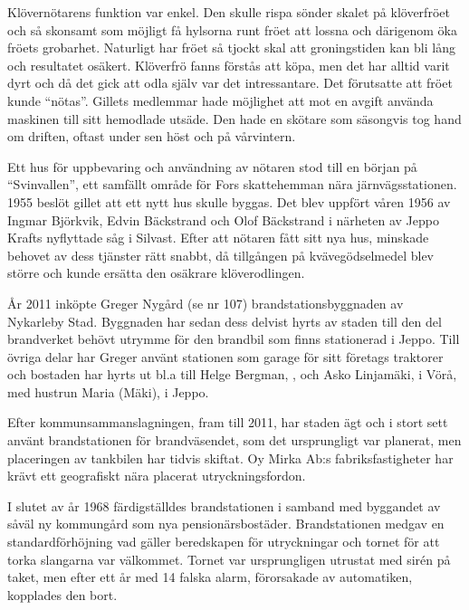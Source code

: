 Klövernötarens funktion var enkel. Den skulle rispa sönder skalet på klöverfröet och så skonsamt som möjligt få hylsorna runt fröet att lossna och därigenom öka fröets grobarhet. Naturligt har fröet så tjockt skal att groningstiden kan bli lång och resultatet osäkert. Klöverfrö fanns förstås att köpa, men det har alltid varit dyrt och då det gick att odla själv var det intressantare. Det förutsatte att fröet kunde ``nötas''. Gillets medlemmar hade möjlighet att mot en avgift använda maskinen till sitt hemodlade utsäde. Den hade en skötare som säsongvis tog hand om driften, oftast under sen höst och på vårvintern.

Ett hus för uppbevaring och användning av nötaren stod till en början på ``Svinvallen'', ett samfällt område för Fors skattehemman nära järnvägsstationen. 1955 beslöt gillet att ett nytt hus skulle byggas. Det blev uppfört våren 1956 av Ingmar Björkvik, Edvin  Bäckstrand och Olof Bäckstrand i närheten av Jeppo Krafts nyflyttade såg i Silvast. Efter att nötaren fått sitt nya hus, minskade behovet av dess tjänster rätt snabbt, då tillgången på kvävegödselmedel blev större och kunde ersätta den osäkrare klöverodlingen.






År 2011 inköpte Greger Nygård (se nr 107) brandstationsbyggnaden av Nykarleby Stad. Byggnaden har sedan dess delvist hyrts av staden till den del brandverket behövt utrymme för den brandbil som finns stationerad i Jeppo. Till övriga delar har Greger använt stationen som garage för sitt företags traktorer och bostaden har hyrts ut bl.a till Helge Bergman, , och Asko Linjamäki,  i Vörå, med hustrun Maria (Mäki),  i Jeppo.


Efter kommunsammanslagningen, fram till 2011, har staden ägt och i stort sett använt brandstationen för brandväsendet, som det ursprungligt var planerat, men placeringen av tankbilen har tidvis skiftat. Oy Mirka Ab:s fabriksfastigheter har krävt ett geografiskt nära placerat utryckningsfordon.


I slutet av år 1968 färdigställdes brandstationen i samband med byggandet av såväl ny kommungård som nya pensionärsbostäder. Brandstationen medgav en standardförhöjning vad gäller beredskapen för utryckningar och tornet för att torka slangarna var välkommet. Tornet var ursprungligen utrustat med sirén på taket, men efter ett år med 14 falska alarm, förorsakade av automatiken, kopplades den bort.

